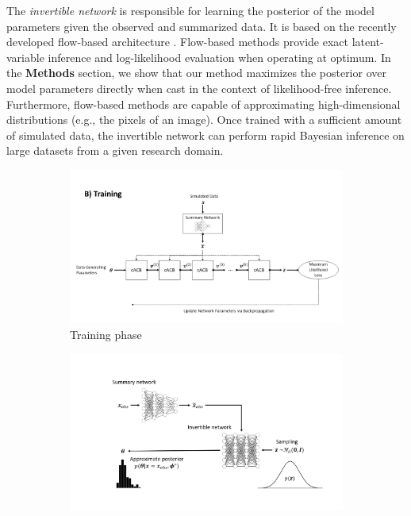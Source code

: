 \documentclass[9pt,twoside,lineno]{pnas-new}
\begin{document}
The \textit{invertible network} is responsible for learning the posterior of the model parameters given the observed and summarized data. It is based on the recently developed flow-based architecture \cite{kingma2018glow, grover2018flow, dinh2016density}. Flow-based methods provide exact latent-variable inference and log-likelihood evaluation when operating at optimum. In the \textbf{Methods} section, we show that our method maximizes the posterior over model parameters directly when cast in the context of likelihood-free inference. Furthermore, flow-based methods are capable of approximating high-dimensional distributions (e.g., the pixels of an image). Once trained with a sufficient amount of simulated data, the invertible network can perform rapid Bayesian inference on large datasets from a given research domain. 
\begin{figure}
  \begin{subfigure}[b]{0.49\textwidth}
    \includegraphics[width=\textwidth]{training.png}
    \caption{Training phase}
    \label{fig:Fig.1a}
  \end{subfigure}
  \begin{subfigure}[b]{0.49\textwidth}
    \includegraphics[width=\textwidth]{inference.png}

\end{subfigure}
\end{figure}
\end{document}
